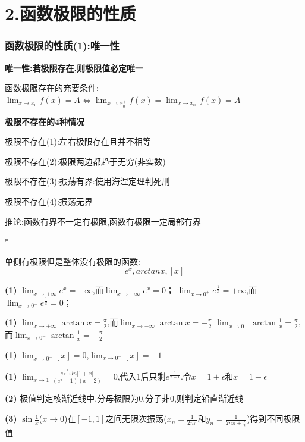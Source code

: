 \documentclass[11pt,a4paper,UTF8]{ctexart}
\begin{document}
\section{2.函数极限的性质}


\subsubsection{函数极限的性质(1):唯一性}

\textbf{唯一性:若极限存在,则极限值必定唯一}

函数极限存在的充要条件:$\lim_{x \to x_0} f(x) = A \iff \lim_{x \to x_0^+} f(x) = \lim_{x \to x_0^-} f(x) = A$

\textbf{极限不存在的4种情况}

极限不存在(1):左右极限存在且并不相等

极限不存在(2):极限两边都趋于无穷(非实数)

极限不存在(3):振荡有界:使用海涅定理判死刑

极限不存在(4):振荡无界

\begin{solbox}[{分步推导与答题规范}]
  推论:函数有界不一定有极限,函数有极限一定局部有界
\end{solbox}

\textit{}*

\textit{}单侧有极限但是整体没有极限的函数:
\begin{equation*}
e^x,arctanx,[x]
\end{equation*}
\textit{}

\textbf{(1)} $\lim_{x \to +\infty} e^x = +\infty$,而$\lim_{x \to -\infty} e^x = 0$；	 $\lim_{x \to 0^+} e^{\frac{1}{x}} = +\infty$,而$\lim_{x \to 0^-} e^{\frac{1}{x}} = 0$；

\textbf{(1)} $\lim_{x \to +\infty} \arctan x = \frac{\pi}{2}$,而$\lim_{x \to -\infty} \arctan x = -\frac{\pi}{2}$	$\lim_{x \to 0^+} \arctan \frac{1}{x} = \frac{\pi}{2}$,而$\lim_{x \to 0^-} \arctan \frac{1}{x} = -\frac{\pi}{2}$

\textbf{(1)} $\lim_{x \to 0^+} [x] = 0$,$\lim_{x \to 0^-} [x] = -1$

\textbf{(1)} $\lim_{x\rightarrow 1}\frac{e^{\frac{1}{x-1}}ln|1+x|}{(e^x-1)(x-2)} = 0$,代入1后只剩$e^{\frac{1}{x-1}}$.令$x=1+\epsilon \text{和}x=1-\epsilon$

\textbf{(2)} 极值判定核渐近线中,分母极限为0,分子非0,则判定铅直渐近线

\textbf{(3)} $\sin\frac{1}{x}$($x \to 0$)在$[-1, 1]$之间无限次振荡($x_n = \frac{1}{2n\pi}$和$y_n = \frac{1}{2n\pi + \frac{\pi}{2}}$)得到不同极限值
\end{document}
